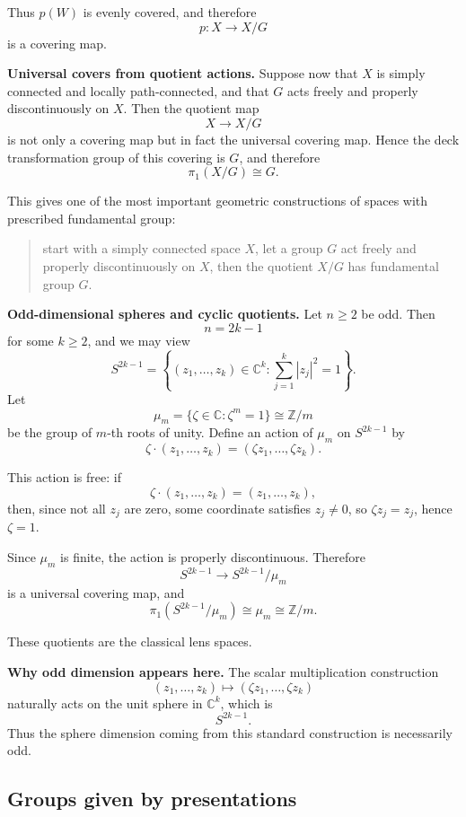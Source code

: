 \documentclass[12pt,a4paper]{article}
\theoremstyle{notespace}
\begin{document}
Thus \(p(W)\) is evenly covered, and therefore
\[
p:X\to X/G
\]
is a covering map.

\medskip

\textbf{Universal covers from quotient actions.}
Suppose now that \(X\) is simply connected and locally path-connected, and that \(G\) acts freely and properly discontinuously on \(X\). Then the quotient map
\[
X\to X/G
\]
is not only a covering map but in fact the universal covering map. Hence the deck transformation group of this covering is \(G\), and therefore
\[
\pi_1(X/G)\cong G.
\]

This gives one of the most important geometric constructions of spaces with prescribed fundamental group:
\begin{quote}
	start with a simply connected space \(X\), let a group \(G\) act freely and properly discontinuously on \(X\), then the quotient \(X/G\) has fundamental group \(G\).
\end{quote}

\medskip

\textbf{Odd-dimensional spheres and cyclic quotients.}
Let \(n\geq 2\) be odd. Then
\[
n=2k-1
\]
for some \(k\geq 2\), and we may view
\[
S^{2k-1}
=
\left\{(z_1,\dots,z_k)\in \mathbb C^k : \sum_{j=1}^k |z_j|^2=1\right\}.
\]
Let
\[
\mu_m=\{\zeta\in\mathbb C : \zeta^m=1\}\cong \mathbb Z/m
\]
be the group of \(m\)-th roots of unity. Define an action of \(\mu_m\) on \(S^{2k-1}\) by
\[
\zeta\cdot(z_1,\dots,z_k)=(\zeta z_1,\dots,\zeta z_k).
\]

This action is free: if
\[
\zeta\cdot(z_1,\dots,z_k)=(z_1,\dots,z_k),
\]
then, since not all \(z_j\) are zero, some coordinate satisfies \(z_j\neq 0\), so \(\zeta z_j=z_j\), hence \(\zeta=1\).

Since \(\mu_m\) is finite, the action is properly discontinuous. Therefore
\[
S^{2k-1}\to S^{2k-1}/\mu_m
\]
is a universal covering map, and
\[
\pi_1(S^{2k-1}/\mu_m)\cong \mu_m\cong \mathbb Z/m.
\]

These quotients are the classical lens spaces.

\medskip

\textbf{Why odd dimension appears here.}
The scalar multiplication construction
\[
(z_1,\dots,z_k)\longmapsto (\zeta z_1,\dots,\zeta z_k)
\]
naturally acts on the unit sphere in \(\mathbb C^k\), which is
\[
S^{2k-1}.
\]
Thus the sphere dimension coming from this standard construction is necessarily odd.

\bigskip

\subsection{Groups given by presentations}
\end{document}
